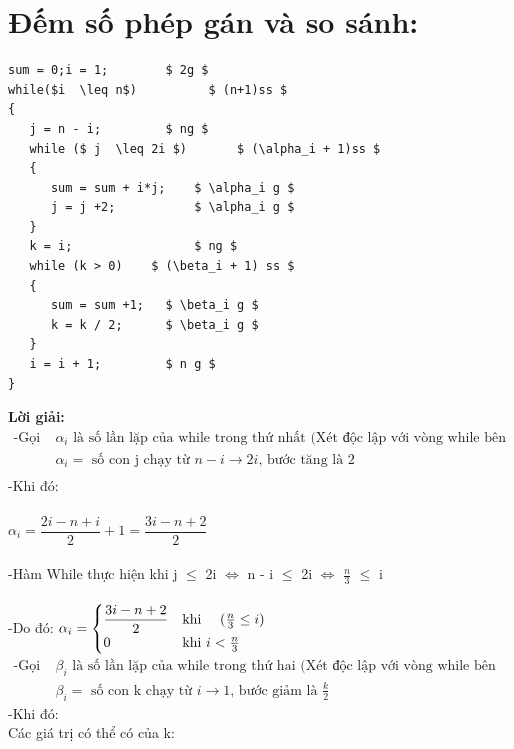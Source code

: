 \documentclass[12pt, letterpaper]{article}
\begin{document}
\section{Đếm số phép gán và so sánh:}
\begin{lstlisting}
sum = 0;i = 1;		  $ 2g $
while($i  \leq n$)			$ (n+1)ss $ 
{    
   j = n - i;		  $ ng $
   while ($ j  \leq 2i $)		$ (\alpha_i + 1)ss $
   {
      sum = sum + i*j;	  $ \alpha_i g $
      j = j +2;           $ \alpha_i g $		
   }
   k = i;             	  $ ng $
   while (k > 0)	$ (\beta_i + 1) ss $
   {
      sum = sum +1;	  $ \beta_i g $
      k = k / 2;	  $ \beta_i g $
   }
   i = i + 1;		  $ n g $
}
	\end{lstlisting}
	\textbf{Lời giải:} \\
	$ \begin{aligned}
		\text{-Gọi } & \alpha_i \text{ là số lần lặp của while trong thứ nhất (Xét độc lập với vòng while bên ngoài)} \\
					& \alpha_i = \text{ số con j chạy từ } n - i \rightarrow 2i \text{, bước tăng là 2} \\
	\end{aligned} $ \\
	-Khi đó:\\ \\
	$\alpha_i = \dfrac{2i - n + i}{2} + 1 = \dfrac{3i - n + 2}{2}$\\ \\
	-Hàm While thực hiện khi j $\leq$ 2i $\Leftrightarrow$ n - i $\leq$ 2i $\Leftrightarrow$ $\frac{n}{3}$ $\leq$ i\\ \\
	-Do đó: $\alpha_i =
	\begin{cases}
	\dfrac{3i - n + 2}{2} &\text{khi } \quad (\frac{n}{3} \leq i)\\
	0 &\text{khi } i < \frac{n}{3}
	\end{cases} \\ \\ $
	$ \begin{aligned}
		\text{-Gọi } & \beta_i \text{ là số lần lặp của while trong thứ hai (Xét độc lập với vòng while bên ngoài)} \\
					& \beta_i = \text{ số con k chạy từ } i \rightarrow 1 \text{, bước giảm là } \frac{k}{2}
	\end{aligned} $ \\
	-Khi đó:\\
	Các giá trị có thể có của k: \\ \\
\end{document}

